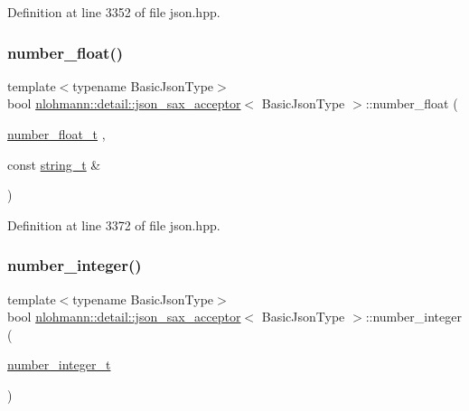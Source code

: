 Definition at line 3352 of file json.\+hpp.

\mbox{\label{classnlohmann_1_1detail_1_1json__sax__acceptor_aebf8800023eb20d472f111f86b189e60}} 
\subsubsection{\texorpdfstring{number\_float()}{number\_float()}}
{\footnotesize\ttfamily template$<$typename Basic\+Json\+Type$>$ \\
bool \mbox{\hyperlink{classnlohmann_1_1detail_1_1json__sax__acceptor}{nlohmann\+::detail\+::json\+\_\+sax\+\_\+acceptor}}$<$ Basic\+Json\+Type $>$\+::number\+\_\+float (\begin{DoxyParamCaption}\item[{\mbox{\hyperlink{classnlohmann_1_1detail_1_1json__sax__acceptor_a5502f483fc60a1bcd73e0e46b6ab36e4}{number\+\_\+float\+\_\+t}}}]{,  }\item[{const \mbox{\hyperlink{classnlohmann_1_1detail_1_1json__sax__acceptor_a3a8078bbf865ec355106f6048241609a}{string\+\_\+t}} \&}]{ }\end{DoxyParamCaption})\hspace{0.3cm}{\ttfamily [inline]}}



Definition at line 3372 of file json.\+hpp.

\mbox{\label{classnlohmann_1_1detail_1_1json__sax__acceptor_a976bf4ce6e9a2ffe48f683ddff80af00}} 
\subsubsection{\texorpdfstring{number\_integer()}{number\_integer()}}
{\footnotesize\ttfamily template$<$typename Basic\+Json\+Type$>$ \\
bool \mbox{\hyperlink{classnlohmann_1_1detail_1_1json__sax__acceptor}{nlohmann\+::detail\+::json\+\_\+sax\+\_\+acceptor}}$<$ Basic\+Json\+Type $>$\+::number\+\_\+integer (\begin{DoxyParamCaption}\item[{\mbox{\hyperlink{classnlohmann_1_1detail_1_1json__sax__acceptor_a41876b17c0e8bdb55580eaf5e4e2ded8}{number\+\_\+integer\+\_\+t}}}]{ }\end{DoxyParamCaption})\hspace{0.3cm}{\ttfamily [inline]}}



